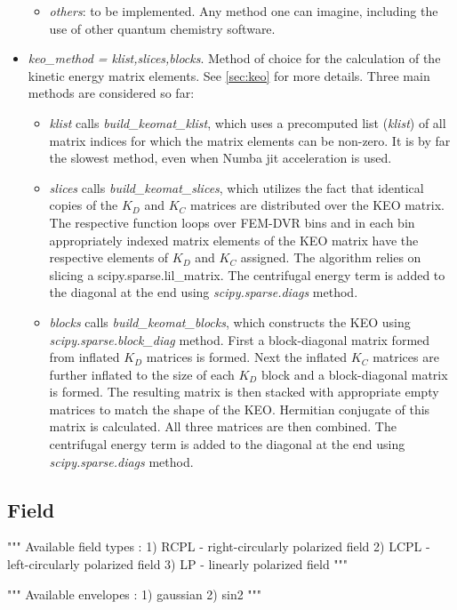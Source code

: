 \documentclass[a4paper,american,floatfix,pdftex,superscriptaddress,twoside,%
aps,pra,
linenumbers,%
reprint,%
]{revtex4-2}%
\begin{document}
\begin{itemize}
\begin{itemize}
		\item \textit{others}: to be implemented. Any method one can imagine, including the use of other quantum chemistry software. 
	\end{itemize}
	\item \textit{keo\_method = klist,slices,blocks}. Method of choice for the calculation of the kinetic energy matrix elements. See \ref{sec:keo} for more details. Three main methods are considered so far:
	\begin{itemize}
		\item \textit{klist} calls \textit{build\_keomat\_klist}, which uses a precomputed list (\textit{klist}) of all matrix indices for which the matrix elements can be non-zero. It is by far the slowest method, even when Numba jit acceleration is used.
		\item \textit{slices}  calls \textit{build\_keomat\_slices}, which utilizes the fact that identical copies of the $K_D$ and $K_C$ matrices are distributed over the KEO matrix. The respective function loops over FEM-DVR bins and in each bin appropriately indexed matrix elements of the KEO matrix have the respective elements of $K_D$ and $K_C$ assigned. The algorithm relies on slicing a scipy.sparse.lil\_matrix. The centrifugal energy term is added to the diagonal at the end using \textit{scipy.sparse.diags} method.
		\item \textit{blocks}  calls \textit{build\_keomat\_blocks}, which constructs the KEO using \textit{scipy.sparse.block\_diag} method. First a block-diagonal matrix formed from inflated $K_D$ matrices is formed. Next the inflated $K_C$ matrices are further inflated to the size of each $K_D$ block and a block-diagonal matrix is formed. The resulting matrix is then stacked with appropriate empty matrices to match the shape of the KEO. Hermitian conjugate of this matrix is calculated. All three matrices are then combined. The centrifugal energy term is added to the diagonal at the end using \textit{scipy.sparse.diags} method. 
	\end{itemize}
\end{itemize}


\subsection{Field}
 """ Available field types :
1) RCPL   - right-circularly polarized field
2) LCPL    - left-circularly polarized field
3) LP      - linearly polarized field
"""

""" Available envelopes :
1) gaussian
2) sin2 
"""

\end{document}
